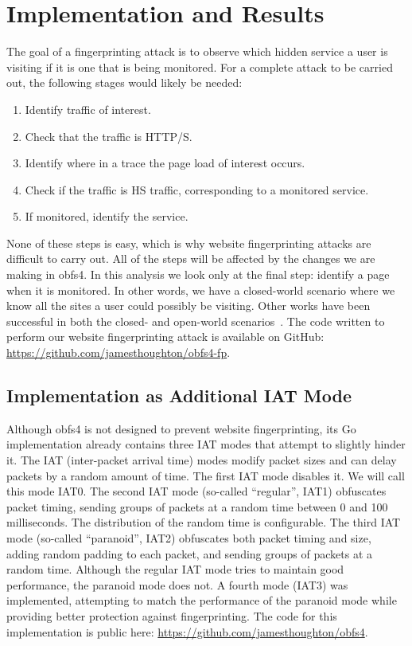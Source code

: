 \documentclass[11pt]{article}
\begin{document}
\section{Implementation and Results}
The goal of a fingerprinting attack is to observe which hidden service a user is visiting if it is one that is being monitored. For a complete attack to be carried out, the following stages would likely be needed:
\begin{enumerate}
    \item Identify traffic of interest.
    \item Check that the traffic is HTTP/S.
    \item Identify where in a trace the page load of interest occurs.
    \item Check if the traffic is HS traffic, corresponding to a monitored service.
    \item If monitored, identify the service.
\end{enumerate}
None of these steps is easy, which is why website fingerprinting attacks are difficult to carry out.
All of the steps will be affected by the changes we are making in obfs4.
In this analysis we look only at the final step: identify a page when it is monitored. In other words, we have a closed-world scenario where we know all the sites a user could possibly be visiting.
Other works have been successful in both the closed- and open-world scenarios~\cite{hayes, wang, panchenko}.
The code written to perform our website fingerprinting attack is available on GitHub: \href{https://github.com/jamesthoughton/obfs4-fp}{https://github.com/jamesthoughton/obfs4-fp}.

\subsection{Implementation as Additional IAT Mode}
Although obfs4 is not designed to prevent website fingerprinting, its Go implementation already contains three IAT modes that attempt to slightly hinder it. The IAT (inter-packet arrival time) modes modify packet sizes and can delay packets by a random amount of time. The first IAT mode disables it. We will call this mode IAT0. The second IAT mode (so-called ``regular'', IAT1) obfuscates packet timing, sending groups of packets at a random time between 0 and 100 milliseconds. The distribution of the random time is configurable. The third IAT mode (so-called ``paranoid'', IAT2) obfuscates both packet timing and size, adding random padding to each packet, and sending groups of packets at a random time. Although the regular IAT mode tries to maintain good performance, the paranoid mode does not. A fourth mode (IAT3) was implemented, attempting to match the performance of the paranoid mode while providing better protection against fingerprinting. The code for this implementation is public here: \href{https://github.com/jamesthoughton/obfs4}{https://github.com/jamesthoughton/obfs4}.
\end{document}
